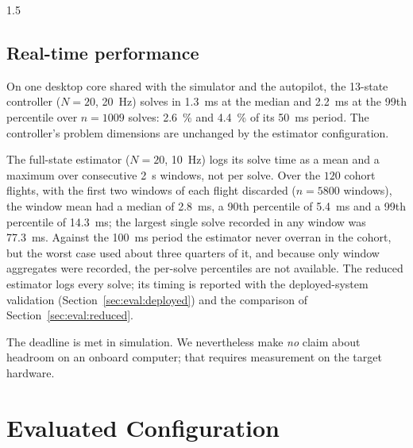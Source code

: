 \begin{spacing}{1.5}
\subsection{Real-time performance}\label{sec:eval:timing}

On one desktop core shared with the simulator and the autopilot, the 13-state
controller ($N=20$, \SI{20}{\hertz}) solves in \SI{1.3}{\milli\second} at the
median and \SI{2.2}{\milli\second} at the 99th percentile over $n=1009$ solves:
\SI{2.6}{\percent} and \SI{4.4}{\percent} of its \SI{50}{\milli\second} period.
The controller's problem dimensions are unchanged by the estimator
configuration.

The full-state estimator ($N=20$, \SI{10}{\hertz}) logs its solve time as a mean
and a maximum over consecutive \SI{2}{\second} windows, not per solve. Over the
$120$ cohort flights, with the first two windows of each flight discarded
($n=5800$ windows), the window mean had a median of \SI{2.8}{\milli\second}, a
90th percentile of \SI{5.4}{\milli\second} and a 99th percentile of
\SI{14.3}{\milli\second}; the largest single solve recorded in any window was
\SI{77.3}{\milli\second}. Against the \SI{100}{\milli\second} period the
estimator never overran in the cohort, but the worst case used about three
quarters of it, and because only window aggregates were recorded, the
per-solve percentiles are not available. The reduced estimator logs every solve;
its timing is reported with the deployed-system validation
(Section~\ref{sec:eval:deployed}) and the comparison of
Section~\ref{sec:eval:reduced}.

The deadline is met in simulation. We nevertheless make \emph{no} claim about
headroom on an onboard computer; that requires measurement on the target
hardware.

\section{Evaluated Configuration}\label{sec:eval:config}


\end{spacing}

